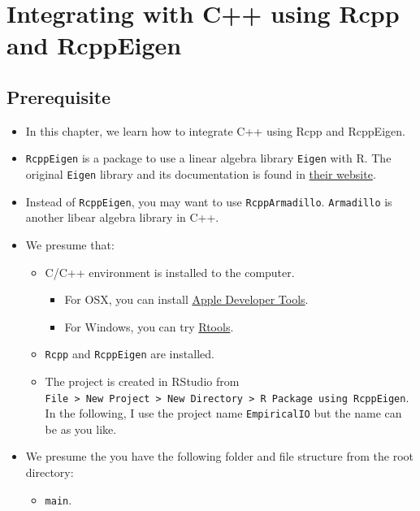 \documentclass[]{book}
\providecommand{\tightlist}{%
  \setlength{\itemsep}{0pt}\setlength{\parskip}{0pt}}
\begin{document}
\chapter{Integrating with C++ using Rcpp and RcppEigen}\label{rcpp}

\section{Prerequisite}\label{prerequisite}

\begin{itemize}
\item
  In this chapter, we learn how to integrate C++ using Rcpp and
  RcppEigen.
\item
  \texttt{RcppEigen} is a package to use a linear algebra library
  \texttt{Eigen} with R. The original \texttt{Eigen} library and its
  documentation is found in
  \href{http://eigen.tuxfamily.org/index.php?title=Main_Page}{their
  website}.
\item
  Instead of \texttt{RcppEigen}, you may want to use
  \texttt{RcppArmadillo}. \texttt{Armadillo} is another libear algebra
  library in C++.
\item
  We presume that:

  \begin{itemize}
  \tightlist
  \item
    C/C++ environment is installed to the computer.

    \begin{itemize}
    \tightlist
    \item
      For OSX, you can install
      \href{https://developer.apple.com/xcode/}{Apple Developer Tools}.
    \item
      For Windows, you can try
      \href{https://cran.r-project.org/bin/windows/Rtools/}{Rtools}.
    \end{itemize}
  \item
    \texttt{Rcpp} and \texttt{RcppEigen} are installed.
  \item
    The project is created in RStudio from
    \texttt{File\ \textgreater{}\ New\ Project\ \textgreater{}\ New\ Directory\ \textgreater{}\ R\ Package\ using\ RcppEigen}.
    In the following, I use the project name \texttt{EmpiricalIO} but
    the name can be as you like.
  \end{itemize}
\item
  We presume the you have the following folder and file structure from
  the root directory:

  \begin{itemize}
  \tightlist
  \item
    \texttt{main}.


\end{itemize}
\end{itemize}
\end{document}
